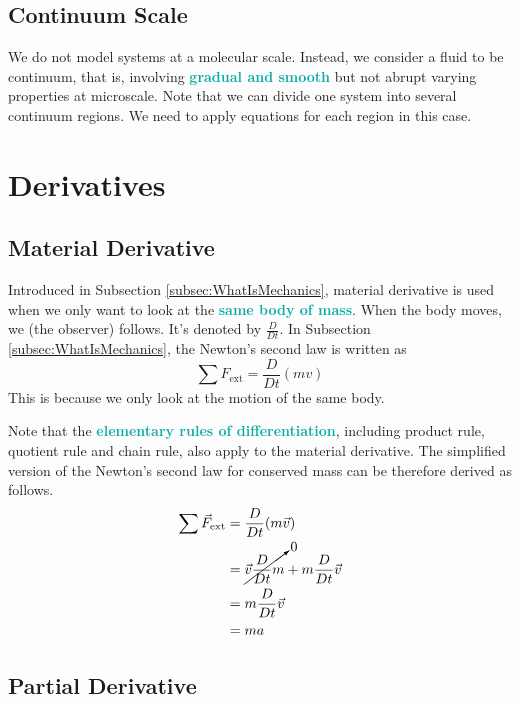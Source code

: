 \documentclass[twoside]{article}
\newcommand{\highlightbluetext}[1]{\textcolor[HTML]{09ACA6}{\textbf{#1}}}
\numberwithin{equation}{section}
\begin{document}
	\subsection{Continuum Scale}
	\label{subsec:ContinuumScale}
	
	We do not model systems at a molecular scale. Instead, we consider a fluid to be continuum, that is, involving \highlightbluetext{gradual and smooth} but not abrupt varying properties at microscale. Note that we can divide one system into several continuum regions. We need to apply equations for each region in this case.
	
	\newpage
	
	\section{Derivatives}
	\label{sec:Derivatives}
	
	\subsection{Material Derivative}
	\label{subsec:MaterialDerivative}
	
	Introduced in Subsection \ref{subsec:WhatIsMechanics}, material derivative is used when we only want to look at the \highlightbluetext{same body of mass}. When the body moves, we (the observer) follows. It's denoted by $\frac{D}{Dt}$. In Subsection \ref{subsec:WhatIsMechanics}, the Newton's second law is written as
	\begin{equation*}
		\sum F_{\text{ext}} = \frac{D}{Dt} (mv)
	\end{equation*}
	This is because we only look at the motion of the same body.
	
	Note that the \highlightbluetext{elementary rules of differentiation}, including product rule, quotient rule and chain rule, also apply to the material derivative. The simplified version of the Newton's second law for conserved mass can be therefore derived as follows.
	\begin{align*}
		\sum \vec{F}_{\text{ext}} &= \frac{D}{Dt} (m \vec{v}) \\
		&= \cancelto{0}{\vec{v} \frac{D}{Dt} m}+m \frac{D}{Dt} \vec{v} \\
		&= m \frac{D}{Dt} \vec{v} \\
		&= ma
	\end{align*}
	
	\subsection{Partial Derivative}
	\label{subsec:PartialDerivative}
	
\end{document}
